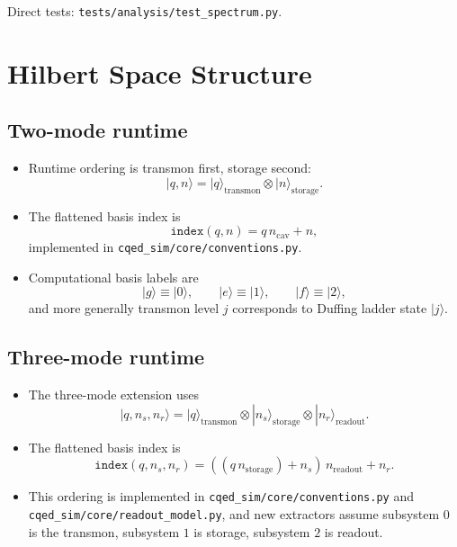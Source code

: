 \documentclass[11pt]{article}
\begin{document}
\noindent
Direct tests: \texttt{tests/analysis/test\_spectrum.py}.

\section{Hilbert Space Structure}
\subsection*{Two-mode runtime}
\begin{itemize}[leftmargin=1.5em]
  \item Runtime ordering is transmon first, storage second:
  \[
  |q,n\rangle
  =
  |q\rangle_{\mathrm{transmon}}
  \otimes
  |n\rangle_{\mathrm{storage}}.
  \]
  \item The flattened basis index is
  \[
  \texttt{index}(q,n)=q\,n_{\mathrm{cav}}+n,
  \]
  implemented in \texttt{cqed\_sim/core/conventions.py}.
  \item Computational basis labels are
  \[
  |g\rangle \equiv |0\rangle,\qquad
  |e\rangle \equiv |1\rangle,\qquad
  |f\rangle \equiv |2\rangle,
  \]
  and more generally transmon level \(j\) corresponds to Duffing ladder state \(|j\rangle\).
\end{itemize}

\subsection*{Three-mode runtime}
\begin{itemize}[leftmargin=1.5em]
  \item The three-mode extension uses
  \[
  |q,n_s,n_r\rangle
  =
  |q\rangle_{\mathrm{transmon}}
  \otimes
  |n_s\rangle_{\mathrm{storage}}
  \otimes
  |n_r\rangle_{\mathrm{readout}}.
  \]
  \item The flattened basis index is
  \[
  \texttt{index}(q,n_s,n_r)=((q\,n_{\mathrm{storage}})+n_s)\,n_{\mathrm{readout}}+n_r.
  \]
  \item This ordering is implemented in
  \texttt{cqed\_sim/core/conventions.py} and
  \texttt{cqed\_sim/core/readout\_model.py}, and new extractors assume subsystem
  \(0\) is the transmon, subsystem \(1\) is storage, subsystem \(2\) is readout.
\end{itemize}
\end{document}
